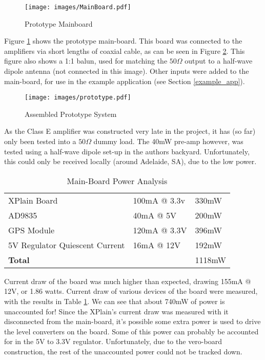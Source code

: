\documentclass[a4paper,12pt]{article}
\begin{document}
\begin{figure}[h]
  \begin{center}
    \texttt{[image: images/MainBoard.pdf]}
  \end{center}
  \caption{Prototype Mainboard}
  \label{fig:mainboard}
\end{figure}

Figure \ref{fig:mainboard} shows the prototype main-board. This board was connected to the amplifiers via short lengths of coaxial cable, as can be seen in Figure \ref{fig:prototype}. This figure also shows a 1:1 balun, used for matching the $50\Omega$ output to a half-wave dipole antenna (not connected in this image). Other inputs were added to the main-board, for use in the example application (see Section \ref{example_app}).

\begin{figure}[h]
  \begin{center}
    \texttt{[image: images/prototype.pdf]}
  \end{center}
  \caption{Assembled Prototype System}
  \label{fig:prototype}
\end{figure}

As the Class E amplifier was constructed very late in the project, it has (so far) only been tested into a $50\Omega$ dummy load. The 40mW pre-amp however, was tested using a half-wave dipole set-up in the authors backyard. Unfortunately, this could only be received locally (around Adelaide, SA), due to the low power.

\begin{table}[h]
\begin{center}
\caption{Main-Board Power Analysis}
\begin{tabular}{l|l|l}
XPlain Board & 100mA @ 3.3v & 330mW\\
AD9835 & 40mA @ 5V & 200mW\\
GPS Module & 120mA @ 3.3V & 396mW\\
5V Regulator Quiescent Current & 16mA @ 12V & 192mW\\
\hline
\textbf{Total} & & 1118mW\\
\end{tabular}
\end{center}
\label{table:mainboard_power}
\end{table}

Current draw of the board was much higher than expected, drawing 155mA @ 12V, or 1.86 watts. Current draw of various devices of the board were measured, with the results in Table \ref{table:mainboard_power}. We can see that about 740mW of power is unaccounted for! 
Since the XPlain's current draw was measured with it disconnected from the main-board, it's possible some extra power is used to drive the level converters on the board. Some of this power can probably be accounted for in the 5V to 3.3V regulator. Unfortunately, due to the vero-board construction, the rest of the unaccounted power could not be tracked down.
\end{document}
